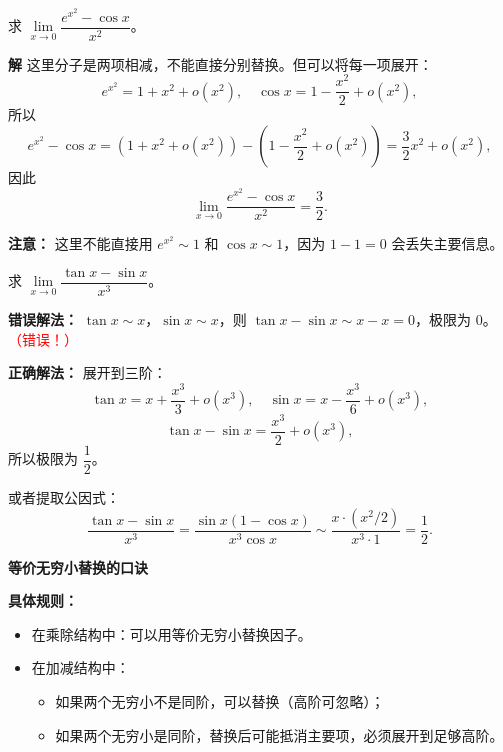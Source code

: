 \documentclass[fontset=fandol]{ctexart}
\newenvironment{custom}[1]{\par\noindent\textbf{#1}\quad}{\par\vspace{0.8em}}
\begin{document}
\begin{example}[乘除结构中的复杂替换]
求 \(\lim\limits_{x \to 0} \dfrac{e^{x^2} - \cos x}{x^2}\)。
\end{example}
\begin{custom}{解}
这里分子是两项相减，不能直接分别替换。但可以将每一项展开：
\[
e^{x^2} = 1 + x^2 + o(x^2),\quad \cos x = 1 - \dfrac{x^2}{2} + o(x^2),
\]
所以
\[
e^{x^2} - \cos x = \left(1 + x^2 + o(x^2)\right) - \left(1 - \dfrac{x^2}{2} + o(x^2)\right) = \dfrac{3}{2}x^2 + o(x^2),
\]
因此
\[
\lim_{x \to 0} \dfrac{e^{x^2} - \cos x}{x^2} = \dfrac{3}{2}.
\]

\textbf{注意：} 这里不能直接用 \(e^{x^2} \sim 1\) 和 \(\cos x \sim 1\)，因为 \(1-1=0\) 会丢失主要信息。
\end{custom}

\begin{example}[加减结构中的错误示例]
求 \(\lim\limits_{x \to 0} \dfrac{\tan x - \sin x}{x^3}\)。

\textbf{错误解法：} \(\tan x \sim x\)，\(\sin x \sim x\)，则 \(\tan x - \sin x \sim x - x = 0\)，极限为 0。\textcolor{red}{（错误！）}

\textbf{正确解法：} 展开到三阶：
\[
\tan x = x + \dfrac{x^3}{3} + o(x^3),\quad \sin x = x - \dfrac{x^3}{6} + o(x^3),
\]
\[
\tan x - \sin x = \dfrac{x^3}{2} + o(x^3),
\]
所以极限为 \(\dfrac{1}{2}\)。

或者提取公因式：
\[
\dfrac{\tan x - \sin x}{x^3} = \dfrac{\sin x(1 - \cos x)}{x^3 \cos x} \sim \dfrac{x \cdot (x^2/2)}{x^3 \cdot 1} = \dfrac{1}{2}.
\]
\end{example}

\begin{custom}{等价无穷小替换的口诀}
\begin{center}
\end{center}

\textbf{具体规则：}
\begin{itemize}
\item 在乘除结构中：可以用等价无穷小替换因子。
\item 在加减结构中：
  \begin{itemize}
    \item 如果两个无穷小不是同阶，可以替换（高阶可忽略）；
    \item 如果两个无穷小是同阶，替换后可能抵消主要项，必须展开到足够高阶。
  \end{itemize}
\end{itemize}
\end{custom}
\end{document}
